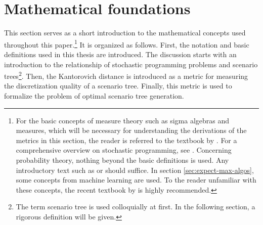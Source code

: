 \section{Mathematical foundations}
\label{sec:math-foundations}
This section serves as a short introduction to the mathematical concepts used throughout this paper.\footnote{For the basic concepts of measure theory such as sigma algebras and measures, which will be necessary for understanding the derivations of the metrics in this section, the reader is referred to the textbook by \citet{Elstrodt2007}.
For a comprehensive overview on stochastic programming, see \citet{Birge1997}.
Concerning probability theory, nothing beyond the basic definitions is used.
Any introductory text such as \citet{Billingsley1995} or \citet{Bauer1991} should suffice.
In section \ref{sec:expect-max-algos}, some concepts from machine learning are used.
To the reader unfamiliar with these concepts, the recent textbook by \citet{Bishop2006} is highly recommended.}
It is organized as follows.
First, the notation and basic definitions used in this thesis are introduced.
The discussion starts with an introduction to the relationship of stochastic programming problems and scenario trees\footnote{The term scenario tree is used colloquially at first. In the following section, a rigorous definition will be given.}.
Then, the Kantorovich distance is introduced as a metric for measuring the discretization quality of a scenario tree.
Finally, this metric is used to formalize the problem of optimal scenario tree generation.
